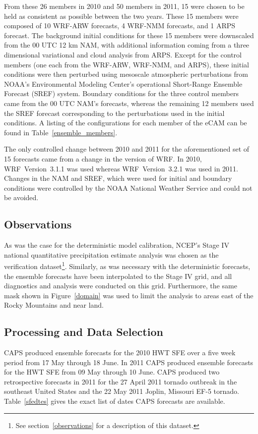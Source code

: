 From these 26 members in 2010 and 50 members in 2011, 15 were chosen to be held as consistent as possible between the two years.
These 15 members were composed of 10 WRF-ARW forecasts, 4 WRF-NMM forecasts, and 1 ARPS forecast.
The background initial conditions for these 15 members were downscaled from the 00 UTC 12 km NAM, with additional information coming from a three dimensional variational and cloud analysis from ARPS.
Except for the control members (one each from the WRF-ARW, WRF-NMM, and ARPS), these initial conditions were then perturbed using mesoscale atmospheric perturbations from NOAA's Environmental Modeling Center's operational Short-Range Ensemble Forecast (SREF) system.
Boundary conditions for the three control members came from the 00 UTC NAM's forecasts, whereas the remaining 12 members used the SREF forecast corresponding to the perturbations used in the initial conditions. A listing of the configurations for each member of the eCAM can be found in \mbox{Table \ref{ensemble_members}}.


The only controlled change between 2010 and 2011 for the aforementioned set of 15 forecasts came from a change in the version of WRF. In 2010, \mbox{WRF Version 3.1.1} was used whereas \mbox{WRF Version 3.2.1} was used in 2011.
Changes in the NAM and SREF, which were used for initial and boundary conditions were controlled by the NOAA National Weather Service and could not be avoided.




\subsection{Observations}
\label{eobservations}

As was the case for the deterministic model calibration, NCEP's Stage IV national quantitative precipitation estimate analysis was chosen as the verification dataset\footnote{See \mbox{section \ref{observations}} for a description of this dataset.}.
Similarly, as was necessary with the deterministic forecasts, the ensemble forecasts have been interpolated to the Stage IV grid, and all diagnostics and analysis were conducted on this grid.
Furthermore, the same mask shown in \mbox{Figure \ref{domain}} was used to limit the analysis to areas east of the Rocky Mountains and near land.




\subsection{Processing and Data Selection}
\label{eprocessing}

CAPS produced ensemble forecasts for the 2010 HWT SFE over a five week period from 17 May through 18 June.
In 2011 CAPS produced ensemble forecasts for the HWT SFE from 09 May through 10 June.
CAPS produced two retrospective forecasts in 2011 for the 27 April 2011 tornado outbreak in the southeast United States and the 22 May 2011 Joplin, Missouri EF-5 tornado.
\mbox{Table \ref{sfedtes}} gives the exact list of dates CAPS forecasts are available.



